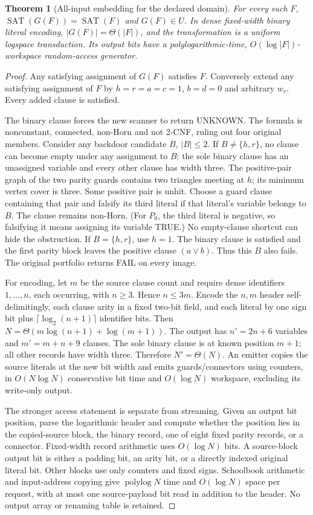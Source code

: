 \documentclass[11pt]{article}
\newtheorem{theorem}{Theorem}
\begin{document}
\begin{theorem}[All-input embedding for the declared domain]
For every such $F$, $\operatorname{SAT}(G(F))=\operatorname{SAT}(F)$
and $G(F)\in U$. In dense fixed-width binary literal encoding,
$|G(F)|=\Theta(|F|)$, and the transformation is a uniform logspace
transduction. Its output bits have a polylogarithmic-time,
$O(\log |F|)$-workspace random-access generator.
\end{theorem}
\begin{proof}
Any satisfying assignment of $G(F)$ satisfies $F$. Conversely extend
any satisfying assignment of $F$ by $h=r=a=c=1$, $b=d=0$ and arbitrary
$w_v$. Every added clause is satisfied.

The binary clause forces the new scanner to return UNKNOWN. The
formula is nonconstant, connected, non-Horn and not 2-CNF, ruling out
four original members. Consider any backdoor candidate $B$, $|B|\le2$.
If $B\ne\{h,r\}$, no clause can become empty under any assignment to
$B$: the sole binary clause has an unassigned variable and every other
clause has width three. The positive-pair graph of the two parity guards
contains two triangles meeting at $h$; its minimum vertex cover is three.
Some positive pair is unhit. Choose a guard clause containing that pair
and falsify its third literal if that literal's variable belongs to $B$.
The clause remains non-Horn. (For $P_0$, the third literal is negative,
so falsifying it means assigning its variable TRUE.) No empty-clause
shortcut can hide the obstruction. If $B=\{h,r\}$, use $h=1$.
The binary clause is satisfied and the first parity block leaves the
positive clause $(a\vee b)$. Thus this $B$ also fails. The original
portfolio returns FAIL on every image.

For encoding, let $m$ be the source clause count and require dense
identifiers $1,\ldots,n$, each occurring, with $n\ge3$. Hence $n\le3m$.
Encode the $n,m$ header self-delimitingly, each clause arity in a fixed
two-bit field, and each literal by one sign bit plus
$\lceil\log_2(n+1)\rceil$ identifier bits. Then
$N=\Theta(m\log(n+1)+\log(m+1))$. The output has
$n'=2n+6$ variables and $m'=m+n+9$ clauses. The sole binary clause is
at known position $m+1$; all other records have width three. Therefore
$N'=\Theta(N)$. An emitter copies the source literals at the new bit
width and emits guards/connectors using counters, in $O(N\log N)$
conservative bit time and $O(\log N)$ workspace, excluding its
write-only output.

The stronger access statement is separate from streaming. Given an
output bit position, parse the logarithmic header and compute whether
the position lies in the copied-source block, the binary record, one
of eight fixed parity records, or a connector. Fixed-width record
arithmetic uses $O(\log N)$ bits. A source-block output bit is either
a padding bit, an arity bit, or a directly indexed original literal
bit. Other blocks use only counters and fixed signs. Schoolbook
arithmetic and input-address copying give $\operatorname{polylog}N$
time and $O(\log N)$ space per request, with at most one source-payload
bit read in addition to the header. No output array or renaming table
is retained.
\end{proof}
\end{document}
